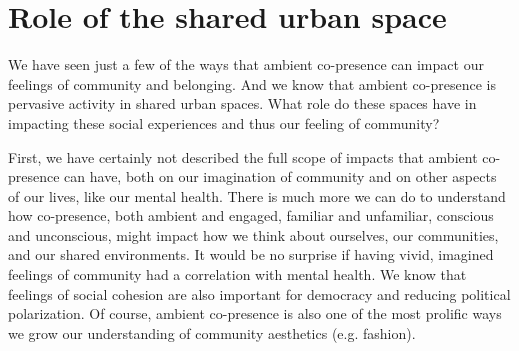 \documentclass[12pt]{article}
\begin{document}












\section{Role of the shared urban space}

We have seen just a few of the ways that ambient co-presence can impact our feelings of community and belonging. And we know that ambient co-presence is pervasive activity in shared urban spaces. What role do these spaces have in impacting these social experiences and thus our feeling of community?

First, we have certainly not described the full scope of impacts that ambient co-presence can have, both on our imagination of community and on other aspects of our lives, like our mental health. There is much more we can do to understand how co-presence, both ambient and engaged, familiar and unfamiliar, conscious and unconscious, might impact how we think about ourselves, our communities, and our shared environments. It would be no surprise if having vivid, imagined feelings of community had a correlation with mental health. We know that feelings of social cohesion are also important for democracy and reducing political polarization. Of course, ambient co-presence is also one of the most prolific ways we grow our understanding of community aesthetics (e.g. fashion).
\end{document}
